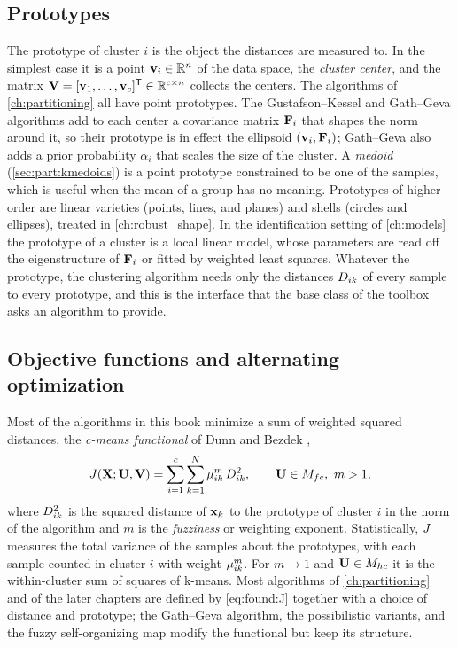 \subsection{Prototypes}\label{sec:found:prototypes}

The prototype of cluster $i$ is the object the distances are measured to. In the simplest case it is a point $\mathbf{v}_i\in\mathbb{R}^n$ of the data space, the \emph{cluster center}, and the matrix $\mathbf{V}=[\mathbf{v}_1,\dots,\mathbf{v}_c]^{\mathsf{T}}\in\mathbb{R}^{c\times n}$ collects the centers. The algorithms of \cref{ch:partitioning} all have point prototypes. The Gustafson--Kessel and Gath--Geva algorithms add to each center a covariance matrix $\mathbf{F}_i$ that shapes the norm around it, so their prototype is in effect the ellipsoid $(\mathbf{v}_i,\mathbf{F}_i)$; Gath--Geva also adds a prior probability $\alpha_i$ that scales the size of the cluster. A \emph{medoid} (\cref{sec:part:kmedoids}) is a point prototype constrained to be one of the samples, which is useful when the mean of a group has no meaning. Prototypes of higher order are linear varieties (points, lines, and planes) and shells (circles and ellipses), treated in \cref{ch:robust_shape}. In the identification setting of \cref{ch:models} the prototype of a cluster is a local linear model, whose parameters are read off the eigenstructure of $\mathbf{F}_i$ or fitted by weighted least squares. Whatever the prototype, the clustering algorithm needs only the distances $D_{ik}$ of every sample to every prototype, and this is the interface that the base class of the toolbox asks an algorithm to provide.

\subsection{Objective functions and alternating optimization}\label{sec:found:ao}

Most of the algorithms in this book minimize a sum of weighted squared distances, the \emph{c-means functional} of Dunn \cite{dunn:1973:fcm} and Bezdek \cite{bezdek:1981},
\begin{equation}
  J(\mathbf{X};\mathbf{U},\mathbf{V})=\sum_{i=1}^{c}\sum_{k=1}^{N}\mu_{ik}^m\,D^2_{ik},\qquad \mathbf{U}\in M_{fc},\ m>1,
  \label{eq:found:J}
\end{equation}
where $D^2_{ik}$ is the squared distance of $\mathbf{x}_k$ to the prototype of cluster $i$ in the norm of the algorithm and $m$ is the \emph{fuzziness} or weighting exponent. Statistically, $J$ measures the total variance of the samples about the prototypes, with each sample counted in cluster $i$ with weight $\mu_{ik}^m$. For $m\to1$ and $\mathbf{U}\in M_{hc}$ it is the within-cluster sum of squares of k-means. Most algorithms of \cref{ch:partitioning} and of the later chapters are defined by \eqref{eq:found:J} together with a choice of distance and prototype; the Gath--Geva algorithm, the possibilistic variants, and the fuzzy self-organizing map modify the functional but keep its structure.

